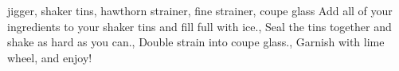 \documentclass[../main.tex]{subfiles}
\begin{document}


%
{jigger, shaker tins, hawthorn strainer, fine strainer, coupe glass}
%
{
	Add all of your ingredients to your shaker tins and fill full with ice.,
	Seal the tins together and shake as hard as you can.,
	Double strain into coupe glass.,
	{Garnish with lime wheel, and enjoy!}
}
\end{document}
